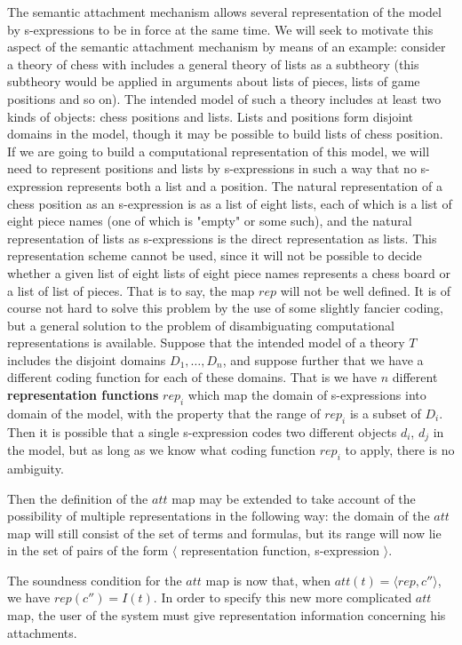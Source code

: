 The semantic attachment mechanism allows several representation of the model 
by {\HG} s-expressions to be in force at the same time.
We will seek to motivate this aspect of the semantic attachment mechanism 
by means of an example: consider a theory of chess with includes a general 
theory of lists as a subtheory (this subtheory would be applied in arguments 
about lists of pieces, lists of game positions and so on).
The intended model of such a theory includes at least two kinds of objects: 
chess positions and lists.
Lists and positions form disjoint domains in the model, though it may be 
possible to build lists of chess position.
If we are going to build a computational representation of this model, we will
need to represent positions and lists by s-expressions in such a way that no 
s-expression represents both a list and a position.
The natural representation of a chess position as an s-expression is as a 
list of eight lists, each of which is a list of eight piece names (one of 
which is "empty" or some such), and the natural representation of lists as 
s-expressions is the direct representation as {\HG} lists.
This representation scheme cannot be used, since it will not be possible to 
decide whether a given list of eight lists of eight piece names represents a 
chess board or a list of list of pieces. 
That is to say, the map $rep$ will not be well defined. 
It is of course not hard to solve this problem by the use of some slightly 
fancier coding, but a general solution to the problem of disambiguating 
computational representations is available.
Suppose that the intended model of a {\GF} theory $T$ includes the disjoint 
domains $D_1,\ldots,D_n$, and suppose further that we have a different coding 
function for each of these domains.
That is we have $n$ different {\bf representation functions} $rep_i$ which map 
the domain of s-expressions into domain of the model, with the property that 
the range of $rep_i$ is a subset of $D_i$.
Then it is possible that a single s-expression codes two different objects 
$d_i$, $d_j$ in the model, but as long as we know what coding function $rep_i$
to apply, there is no ambiguity. 


Then the definition of the $att$ map may be extended to take account of the 
possibility of multiple representations in the following way: the domain of 
the $att$ map will still consist of the set of {\GF} terms and formulas, but
its range will now lie in the set of pairs of the form $\langle$ representation
function, s-expression $\rangle$.

The soundness condition for the $att$ map is now that, when 
$att(t)=\langle rep, c'' \rangle$, we have $rep(c'')=I(t)$.
In order to specify this new more complicated $att$ map, the user of the {\GF}
system must give representation information concerning his attachments.

